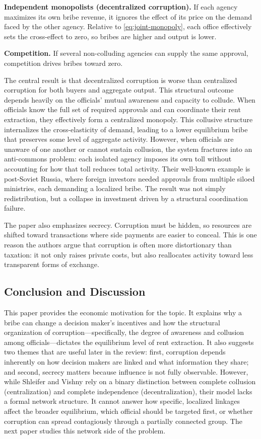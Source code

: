 \documentclass[11pt,letterpaper]{article}
\begin{document}
\medskip
\noindent \textbf{Independent monopolists (decentralized corruption).} If each agency maximizes its own bribe revenue, it ignores the effect of its price on the demand faced by the other agency. Relative to \eqref{eq:joint-monopoly}, each office effectively sets the cross-effect to zero, so bribes are higher and output is lower.

\medskip
\noindent \textbf{Competition.} If several non-colluding agencies can supply the same approval, competition drives bribes toward zero.



\medskip
The central result is that decentralized corruption is worse than centralized corruption for both buyers and aggregate output. This structural outcome depends heavily on the officials' mutual awareness and capacity to collude. When officials know the full set of required approvals and can coordinate their rent extraction, they effectively form a centralized monopoly. This collusive structure internalizes the cross-elasticity of demand, leading to a lower equilibrium bribe that preserves some level of aggregate activity. However, when officials are unaware of one another or cannot sustain collusion, the system fractures into an anti-commons problem: each isolated agency imposes its own toll without accounting for how that toll reduces total activity. Their well-known example is post-Soviet Russia, where foreign investors needed approvals from multiple siloed ministries, each demanding a localized bribe. The result was not simply redistribution, but a collapse in investment driven by a structural coordination failure.

The paper also emphasizes secrecy. Corruption must be hidden, so resources are shifted toward transactions where side payments are easier to conceal. This is one reason the authors argue that corruption is often more distortionary than taxation: it not only raises private costs, but also reallocates activity toward less transparent forms of exchange.

\subsection{Conclusion and Discussion}

This paper provides the economic motivation for the topic. It explains why a bribe can change a decision maker's incentives and how the structural organization of corruption—specifically, the degree of awareness and collusion among officials—dictates the equilibrium level of rent extraction. It also suggests two themes that are useful later in the review: first, corruption depends inherently on how decision makers are linked and what information they share; and second, secrecy matters because influence is not fully observable. However, while Shleifer and Vishny rely on a binary distinction between complete collusion (centralization) and complete independence (decentralization), their model lacks a formal network structure. It cannot answer how specific, localized linkages affect the broader equilibrium, which official should be targeted first, or whether corruption can spread contagiously through a partially connected group. The next paper studies this network side of the problem.
\end{document}
